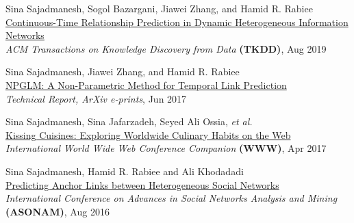 \documentclass[11pt]{article}
\begin{document}
\begin{outerlist}
	\item {Sina Sajadmanesh}, Sogol Bazargani, Jiawei Zhang, and Hamid R. Rabiee\\
	\href{https://dl.acm.org/authorize?N680282}{{Continuous-Time Relationship Prediction in Dynamic Heterogeneous Information Networks}}\\
	\textit{ACM Transactions on Knowledge Discovery from Data} \textbf{(TKDD)}, Aug 2019

	\item {Sina Sajadmanesh}, Jiawei Zhang, and Hamid R. Rabiee\\
	\href{https://arxiv.org/abs/1706.06783}{{NPGLM: A Non-Parametric Method for Temporal Link Prediction}}\\
	\textit{Technical Report, ArXiv e-prints}, Jun 2017

	\item {Sina Sajadmanesh}, Sina Jafarzadeh, Seyed Ali Ossia, \textit{et al.}\\
	\href{https://dl.acm.org/citation.cfm?id=3055137}{{Kissing Cuisines: Exploring Worldwide Culinary Habits on the Web}}\\
	\textit{International World Wide Web Conference Companion} \textbf{(WWW)}, Apr 2017

	\item {Sina Sajadmanesh}, Hamid R. Rabiee and Ali Khodadadi\\
	\href{https://dl.acm.org/doi/pdf/10.5555/3192424.3192453}{{Predicting Anchor Links between Heterogeneous Social Networks}}\\
	\textit{International Conference on Advances in Social Networks Analysis and Mining} \textbf{(ASONAM)},  Aug 2016

\end{outerlist}
\end{document}
